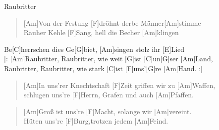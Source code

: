 \begin{song}{Raubritter}{}

    \begin{verse}  
        [Am]Von der Festung [F]dröhnt derbe Männer[Am]stimme\\
        [Am]Rauher Kehle [F]Sang, hell die Becher [Am]klingen
    \end{verse}  

    \begin{chorus}
        [G]Be[C]herrschen dies Ge[G]biet, [Am]singen stolz ihr [E]Lied \\
        |: [Am]Raubritter, Raubritter, wie weit [G]ist [C]un[G]ser [Am]Land,\\
        [F]Raubritter, Raubritter, wie stark [C]ist [F]uns'[G]re [Am]Hand. :|
    \end{chorus}

    \begin{verse}  
        [Am]In uns'rer Knechtschaft [F]Zeit griffen wir zu [Am]Waffen,  \\      
        [Am]schlugen uns're [F]Herrn, Grafen und auch [Am]Pfaffen.
    \end{verse}  


    \begin{verse}  
        [Am]Groß ist uns're [F]Macht, solange wir [Am]vereint.\\
        [Am]Hüten uns're [F]Burg,trotzen jedem [Am]Feind.
    \end{verse}  


\end{song}
